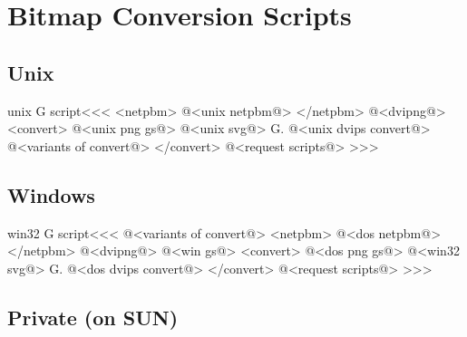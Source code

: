 \documentclass{article}
\begin{document}
\section{Bitmap Conversion Scripts}



\subsection{Unix}




\<unix G script\><<<
<netpbm>
@<unix netpbm@>
</netpbm>
@<dvipng@>
 <convert>
@<unix png gs@>
@<unix svg@>
G.
@<unix dvips convert@>
@<variants of convert@>
 </convert>    
@<request scripts@> %
>>>


\subsection{Windows}



\<win32 G script\><<<
@<variants of convert@>
<netpbm>
@<dos netpbm@>
</netpbm>
@<dvipng@>
@<win gs@>
  <convert>
@<dos png gs@>
@<win32 svg@>
G.
@<dos dvips convert@>
  </convert>
@<request scripts@> %
>>>


\subsection{Private (on SUN)}
\end{document}
